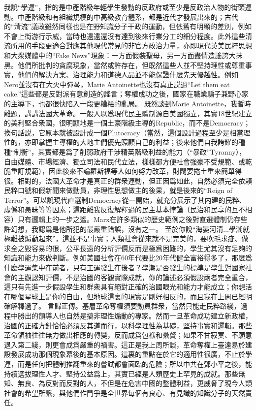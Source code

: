 \documentclass[twocolumn]{ctexart}
\begin{document}
我說“學運”，指的是中產階級年輕學生發動的反政府或至少是反政治人物的街頭運動。中產階級和有組織規模的中高級教育體系，都是近代才發展出來的；古代的“清流”議政雖然同樣也是在野知識分子干政的運動，但依舊有明顯的差別，例如不會上街游行示威，當時也遠遠還沒有達到後來行業分工的細分程度。此外這些清流所用的手段更適合對應其他現代常見的非官方政治力量，亦即現代英美民粹思想和大衆媒體中的“Fake News”現象：一方面假裝聖母，另一方面盡情造謠誇大抹黑。他們所批判的貪腐現象，當然或許存在，但既然這些人並不堅持理性或尊重事實，他們的解決方案、治理能力和道德人品並不能保證什麽先天優越性。例如Nero並沒有在大火中彈琴，Marie Antoinette也沒有真正説過“Let them eat cake.”這些都是反對派有意創造的謠言；奪權成功之後，國家在職業騙子兼野心家的主導下，也都很快陷入一段更糟糕的亂局。
既然談到Marie Antoinette，我暫時離題，講講法國大革命。一般人以爲現代民主體制源自美國獨立，其實18世紀建立的美利堅合衆國，很明顯地是一個土豪階級主導的Republic，而不是Democracy；換句話説，它原本就被設計成一個Plutocracy（當然，這個設計過程至少是相當理性的，亦即掌握主導權的大地主們優先照顧自己的利益；後來他們自我誇耀的種種“制衡”，其實都是爲了削弱政府干涉精英階級利益的能力（“暴政”Tyranny），自由媒體、市場經濟、獨立司法和民代立法，樣樣都方便社會強豪不受規範、或乾脆重訂規範），因此後來不論羅斯福等人如何努力改革，財閥要捲土重來簡單得很。相對的，法國大革命才是真正的群衆運動，但正因爲如此，自然必須完全依賴民粹口號和假新聞來做動員，非理性思想做主的後果，就是後來的“Reign of Terror”。可以說現代直選制Democracy從一開始，就充分展示了其内建的民粹、虛僞和愚昧等等因素；這距離我反復解釋過的民主基本悖論（民治和民享的互不相容）只有邏輯上的一步之遙。Marx在許多類似的歷史範例之後對直選體制仍存些許幻想，我認爲是他所犯的最嚴重錯誤，沒有之一。
至於你說“海晏河清...學潮就極難被煽動起來”，這並不是事實；人類社會從來就不是完美的，要吹毛求疵、做求全之毀容易的很，公平長遠的分析評價反而是極爲困難的，學生尤其沒有足夠的知識和能力來做判斷。例如美國社會在60年代要比20年代健全富裕得多了，那麽爲什麽學運集中在前者，只有工運發生在後者？學潮是否發生的標準是學生對國家社會的主觀認知評價，不是治國的客觀實際成就，你的論述必須假設兩者完全重合，這只有先進一步假設學生和群衆具有絕對正確的治國眼光和能力才能成立；你想活在哪個星球上是你的自由，但地球這裏的現實是剛好相反的，而且我在上周已經明確解釋過了。
言歸正傳。基層革命奪權須要動員群衆，當然只能走民粹路綫，過程中勝出的領導人也自然是搞非理性煽動的專家。然而一旦革命成功建立新政權，治國的正確方針恰恰必須反其道而行，以科學理性為基礎，堅持事實和邏輯。那些革命領袖往往無力做出相應的轉變，反而成爲包袱和纍贅；如果不甘寂寞、不願意退入第二綫，則更會成爲嚴重的禍害。這正是我上周所談，革命奪權上臺遠易於建設發展成功那個現象幕後的基本原因。這裏的重點在於它的適用性很廣，不止於學運，而是任何把體制推翻重來的嘗試都會面臨的危險；所以中共在鄧小平之後，能持續選拔理性人才、堅持公益爲上，其實已經是人類歷史上罕見的成就。那些無知、無良、為反對而反對的人，不但是在危害中國的整體利益，更威脅了現今人類社會的希望所繫，與他們作鬥爭是全世界每個有良心、有見識的知識分子的天然責任。
\end{document}
